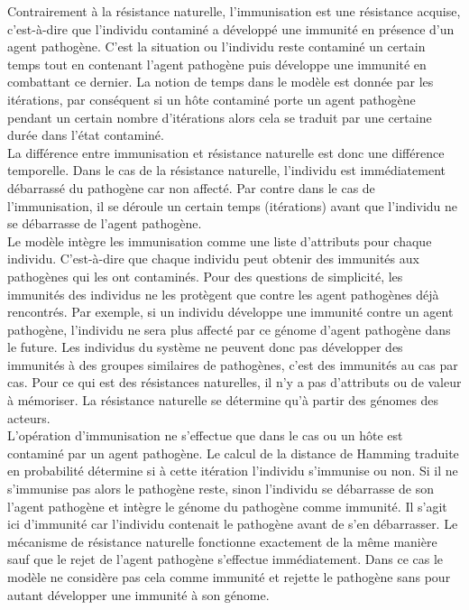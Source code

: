 Contrairement à la résistance naturelle, l'immunisation est une résistance acquise, c'est-à-dire que l'individu contaminé a développé une immunité en présence d'un agent pathogène. C'est la situation ou l'individu reste contaminé un certain temps tout en contenant l'agent pathogène puis développe une immunité en combattant ce dernier. La notion de temps dans le modèle est donnée par les itérations, par conséquent si un hôte contaminé porte un agent pathogène pendant un certain nombre d'itérations alors cela se traduit par une certaine durée dans l'état contaminé.\\

La différence entre immunisation et résistance naturelle est donc une différence temporelle. Dans le cas de la résistance naturelle, l'individu est immédiatement débarrassé du pathogène car non affecté. Par contre dans le cas de l'immunisation, il se déroule un certain temps (itérations) avant que l'individu ne se débarrasse de l'agent pathogène.\\

Le modèle intègre les immunisation comme une liste d'attributs pour chaque individu. C'est-à-dire que chaque individu peut obtenir des immunités aux pathogènes qui les ont contaminés. Pour des questions de simplicité, les immunités des individus ne les protègent que contre les agent pathogènes déjà rencontrés. Par exemple, si un individu développe une immunité contre un agent pathogène, l'individu ne sera plus affecté par ce génome d'agent pathogène dans le future. Les individus du système ne peuvent donc pas développer des immunités à des groupes similaires de pathogènes, c'est des immunités au cas par cas. Pour ce qui est des résistances naturelles, il n'y a pas d'attributs ou de valeur à mémoriser. La résistance naturelle se détermine qu'à partir des génomes des acteurs.\\

L'opération d'immunisation ne s'effectue que dans le cas ou un hôte est contaminé par un agent pathogène. Le calcul de la distance de Hamming traduite en probabilité détermine si à cette itération l'individu s'immunise ou non. Si il ne s'immunise pas alors le pathogène reste, sinon l'individu se débarrasse de son l'agent pathogène et intègre le génome du pathogène comme immunité. Il s'agit ici d'immunité car l'individu contenait le pathogène avant de s'en débarrasser. Le mécanisme de résistance naturelle fonctionne exactement de la même manière sauf que le rejet de l'agent pathogène s'effectue immédiatement. Dans ce cas le modèle ne considère pas cela comme immunité et rejette le pathogène sans pour autant développer une immunité à son génome.

